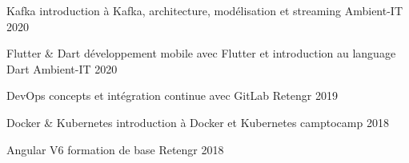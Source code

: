 


\begin{cvhonors}


\cvhonor
{Kafka} %
{introduction à Kafka, architecture, modélisation et streaming} %
{Ambient-IT} %
{2020} %


\cvhonor
{Flutter \& Dart} %
{développement mobile avec Flutter et introduction au language Dart} %
{Ambient-IT} %
{2020} %


\cvhonor
{DevOps} %
{concepts et intégration continue avec GitLab} %
{Retengr} %
{2019} %


\cvhonor
{Docker \& Kubernetes} %
{introduction à Docker et Kubernetes} %
{camptocamp} %
{2018} %


\cvhonor
{Angular V6} %
{formation de base} %
{Retengr} %
{2018} %


\end{cvhonors}
